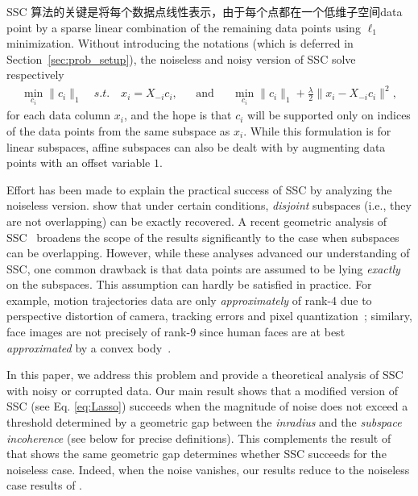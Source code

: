 \documentclass{ctexart}
\begin{document}
SSC 算法的关键是将每个数据点线性表示，由于每个点都在一个低维子空间data point by a sparse linear combination of the remaining data points using $\ell_1$ minimization. Without introducing the notations (which is deferred in Section~\ref{sec:prob_setup}), the noiseless and noisy version of SSC solve respectively
\begin{align*}
  \min_{c_i} \|c_i\|_1\quad s.t.\quad x_i=X_{-i}c_i, && \text{and}&& \min_{c_i} \|c_i\|_1+\frac{\lambda}{2}\|x_i-X_{-i}c_i\|^2,
\end{align*}
for each data column $x_i$, and the hope is that $c_i$ will be supported only on indices of the data points from the same subspace as $x_i$. While this formulation is for linear subspaces, affine subspaces can also be dealt with by augmenting data points with an offset variable $1$.

Effort has been made to explain the practical success of SSC by analyzing the noiseless version. \cite{elhamifar2010ssc_icassp} show that under certain conditions, \emph{disjoint} subspaces (i.e., they are not overlapping) can be exactly recovered.
A recent geometric analysis of SSC~\cite{soltanolkotabi2011geometric} broadens the scope of the results significantly to the case when subspaces can be overlapping. However, while these analyses advanced our understanding of SSC, one common drawback
is that data points are assumed to be lying {\em exactly} on the subspaces. This assumption can hardly be satisfied in practice. For example, motion trajectories data are only {\em approximately} of rank-4 due to perspective distortion of camera, tracking errors and pixel quantization~\cite{costeira1998motion_seg}; similary, face images are   not precisely of rank-9 since human faces are at best {\em approximated} by a convex body~\cite{basri2003lambertianface}.

In this paper, we address this problem and provide a theoretical analysis of SSC with noisy or corrupted data. Our main result shows that a modified version of SSC (see Eq. \eqref{eq:Lasso}) succeeds when the magnitude of noise does not exceed a threshold determined by a geometric gap between the \emph{inradius} and the \emph{subspace incoherence} (see below for precise definitions). This complements the result of \cite{soltanolkotabi2011geometric} that shows the same geometric gap determines whether SSC succeeds for the noiseless case. Indeed,  when the noise vanishes, our results reduce to the noiseless case results of \cite{soltanolkotabi2011geometric}.
\end{document}
